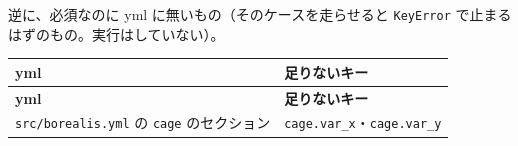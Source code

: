 逆に、必須なのに yml に無いもの（そのケースを走らせると \texttt{KeyError} で止まるはずのもの。実行はしていない）。

\begingroup\small
\begin{longtable}{>{\raggedright\arraybackslash}p{}>{\raggedright\arraybackslash}p{}}
\toprule
\textbf{yml} & \textbf{足りないキー} \\
\midrule
\endfirsthead
\toprule
\textbf{yml} & \textbf{足りないキー} \\
\midrule
\endhead
\bottomrule
\endlastfoot
\texttt{src/\allowbreak{}borealis.\allowbreak{}yml} の \texttt{cage} のセクション & \texttt{cage.\allowbreak{}var\_\allowbreak{}x}・\texttt{cage.\allowbreak{}var\_\allowbreak{}y} \\
\end{longtable}
\endgroup

